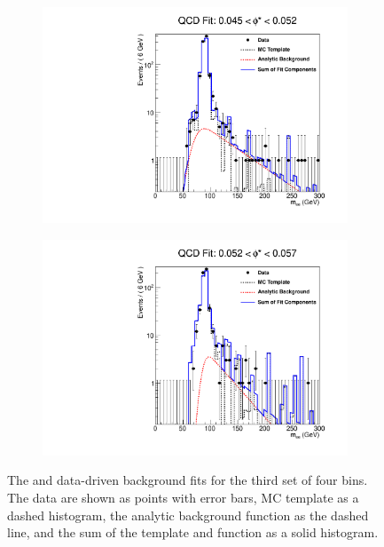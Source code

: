 \begin{figure}[!htbp]
\begin{subfigure}[b]{\SideBySidePlotWidth}
        \includegraphics[width=\linewidth]{figures/qcd_fits/qcd_fit_plot_for_11.pdf}
        \label{fig:qcd_fit_11}
    \end{subfigure}%
    \begin{subfigure}[b]{\SideBySidePlotWidth}
        \includegraphics[width=\linewidth]{figures/qcd_fits/qcd_fit_plot_for_12.pdf}
        \label{fig:qcd_fit_12}
    \end{subfigure}
    \caption[
        The \QCDjets and \wjets data-driven background fits for the third set of
        four \phistar bins.
    ]{
        The \QCDjets and \wjets data-driven background fits for the third set of
        four \phistar bins. The data are shown as points with error bars, MC
        template as a dashed histogram, the analytic background function as the
        dashed line, and the sum of the template and function as a solid
        histogram.
    }
    \label{fig:qcd_many_3}
\end{figure}


